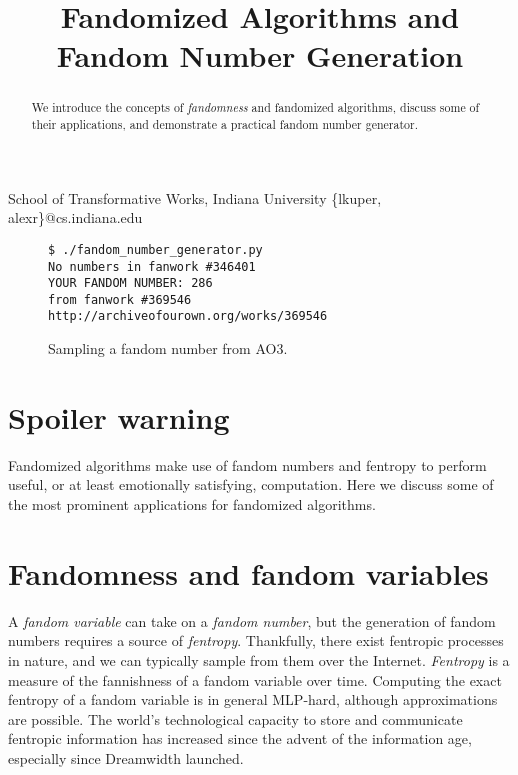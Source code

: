 \documentclass[9pt]{sigplanconf}
\begin{document}
\title{Fandomized Algorithms and Fandom Number Generation}

           {School of Transformative Works, Indiana University}
           {\{lkuper, alexr\}@cs.indiana.edu}

\maketitle

\begin{abstract}
We introduce the concepts of \emph{fandomness} and fandomized algorithms,
discuss some of their applications, and demonstrate a practical fandom number
generator.
\end{abstract}


\begin{figure}[bl]
\begin{verbatim}
$ ./fandom_number_generator.py 
No numbers in fanwork #346401
YOUR FANDOM NUMBER: 286
from fanwork #369546
http://archiveofourown.org/works/369546
\end{verbatim}
\caption{Sampling a fandom number from AO3.}
\end{figure}

\section{Spoiler warning}
Fandomized algorithms make use of fandom numbers and fentropy to
perform useful, or at least emotionally satisfying, computation. Here
we discuss some of the most prominent applications for fandomized
algorithms.



\section{Fandomness and fandom variables}
A \emph{fandom variable} can take on a \emph{fandom number}, but the
generation of fandom numbers requires a source of
\emph{fentropy}. Thankfully, there exist fentropic processes in
nature, and we can typically sample from them over the
Internet. \emph{Fentropy} is a measure of the fannishness of a fandom
variable over time.  Computing the exact fentropy of a fandom variable
is in general MLP-hard, although approximations are possible.  The
world's technological capacity to store and communicate fentropic
information has increased since the advent of the information age,
especially since Dreamwidth launched.
\end{document}
